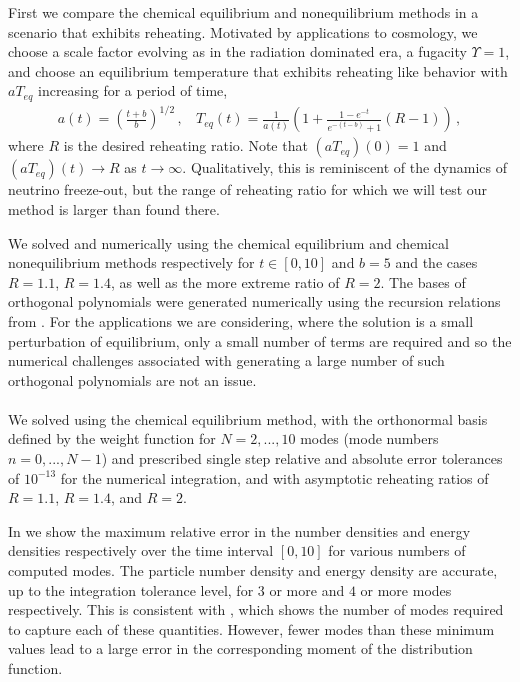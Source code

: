 First we compare the chemical equilibrium and nonequilibrium methods in a scenario that exhibits reheating.  Motivated by applications to cosmology, we choose a scale factor evolving as in the radiation dominated era, a fugacity $\Upsilon=1$, and choose an equilibrium temperature that exhibits reheating like behavior with $aT_{eq}$ increasing for a period of time,
\begin{align}\label{aTDef}
a(t)=\left(\frac{t+b}{b}\right)^{1/2}\,,\ \  \ \
T_{eq}(t)=\frac{1}{a(t)}\left(1+\frac{1-e^{-t}}{e^{-(t-b)}+1}(R-1)\right)\,,
\end{align}
where $R$ is the desired reheating ratio. Note that $(aT_{eq})(0)=1$ and $(aT_{eq})(t)\rightarrow R$ as $t\rightarrow\infty$. Qualitatively, this is reminiscent of the dynamics of neutrino freeze-out, but the range of reheating ratio for which we will test our method is larger than found there.

We solved  and  numerically using the chemical equilibrium and chemical nonequilibrium methods respectively for $t\in[0,10]$ and $b=5$ and the cases $R=1.1$, $R=1.4$, as well as the more extreme ratio of $R=2$.  The bases of orthogonal polynomials were generated numerically using the recursion relations from .  For the applications we are considering, where the solution is a small perturbation of equilibrium, only a small number of terms are required and so the numerical challenges associated with generating a large number of such orthogonal polynomials are not an issue.\\

\\
We solved  using the chemical equilibrium method, with the orthonormal basis defined by the weight function  for $N=2,...,10$ modes (mode numbers $n=0,...,N-1$) and prescribed  single step relative and absolute error tolerances of $10^{-13}$ for the numerical integration, and with asymptotic reheating ratios of $R=1.1$, $R=1.4$, and $R=2$.   

In   
we show the maximum relative error in the number densities and energy densities respectively over the time interval $[0,10]$ for various numbers of computed modes.  The particle number density and energy density are accurate, up to the integration tolerance level, for $3$ or more and $4$ or more modes respectively. This is consistent with , which shows the number of modes required to capture each of these quantities. However, fewer modes than these minimum values lead to a large error in the corresponding moment of the distribution function.

